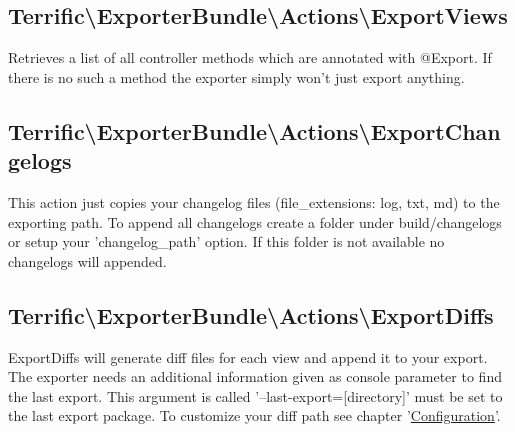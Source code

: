 \noindent \begin{minipage}{\textwidth}
\vspace{1.5em}
\hypertarget{sec-Actions-ExportViews}{\subsection{Terrific\textnormal{\textbackslash}ExporterBundle\textnormal{\textbackslash}Actions\textnormal{\textbackslash}ExportViews}}
Retrieves a list of all controller methods which are annotated with @Export. If there is no such a method the exporter simply won't just export anything.
\end{minipage}

\noindent \begin{minipage}{\textwidth}
\vspace{1.5em}
\hypertarget{sec-Actions-ExportChangelogs}{\subsection{Terrific\textnormal{\textbackslash}ExporterBundle\textnormal{\textbackslash}Actions\textnormal{\textbackslash}ExportChangelogs}}
This action just copies your changelog files (file\_extensions: log, txt, md) to the exporting path. To append all changelogs create a folder under build/changelogs or setup your \mbox{'changelog\_path'} option. If this folder is not available no changelogs will appended.
\end{minipage}

\noindent \begin{minipage}{\textwidth}
\vspace{1.5em}
\hypertarget{sec-Actions-ExportDiffs}{\subsection{Terrific\textnormal{\textbackslash}ExporterBundle\textnormal{\textbackslash}Actions\textnormal{\textbackslash}ExportDiffs}}
ExportDiffs will generate diff files for each view and append it to your export. The exporter needs an additional information given as console parameter to find the last export. This argument is called \mbox{'--last-export=[directory]'} must be set to the last export package. To customize your diff path see chapter \mbox{'\hyperlink{chap-Configuration}{Configuration}'}.
\end{minipage}
